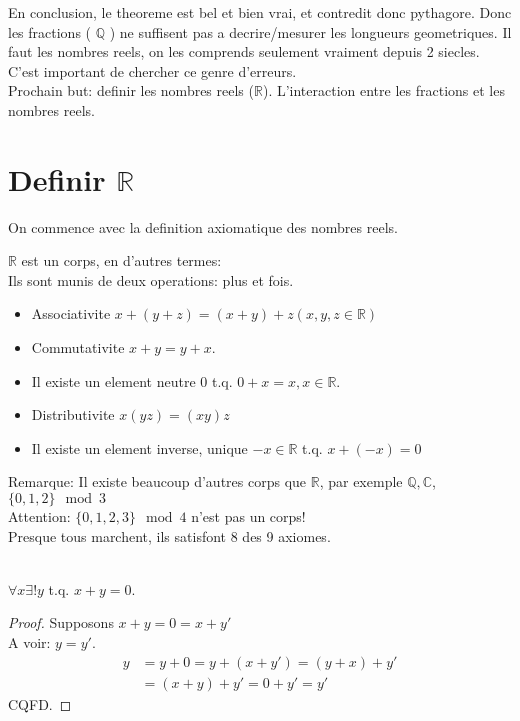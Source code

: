 \documentclass[../main.tex]{subfiles}
\begin{document}
En conclusion, le theoreme est bel et bien vrai, et contredit donc pythagore.
Donc les fractions ( $\mathbb{Q}$ ) ne suffisent pas a decrire/mesurer les longueurs geometriques.
Il faut les nombres reels, on les comprends seulement vraiment depuis 2 siecles.\\
C'est important de chercher ce genre d'erreurs.\\
Prochain but: definir les nombres reels ($\mathbb{R}$).
L'interaction entre les fractions et les nombres reels.

\section{Definir $\mathbb{R}$}
On commence avec la definition axiomatique des nombres reels.

\begin{axiom}\label{axiom:nombres_reels}
	$\mathbb{R}$ est un corps, en d'autres termes:\\
	Ils sont munis de deux operations: plus et fois.
	\begin{itemize}
		\item Associativite $x + ( y + z)= ( x+ y)+z ( x,y,z \in \mathbb{R})$ \\
		\item Commutativite $x+y = y+x$.\\
		\item Il existe un element neutre $0$ t.q. $0+x=x, x \in \mathbb{R}$.
		\item Distributivite $x ( yz)= ( xy)z$\\
		\item Il existe un element inverse, unique $-x \in \mathbb{R}$ t.q. $x + (-x)=0$
	\end{itemize}
\end{axiom}

Remarque: Il existe beaucoup d'autres corps que $\mathbb{R}$, par exemple $\mathbb{Q},\mathbb{C}$, $\{0,1,2\} \mod 3$\\

Attention: $ \{0,1,2,3\} \mod 4$ n'est pas un corps!\\
Presque tous marchent, ils satisfont 8 des 9 axiomes.\\
\hr\\
\begin{lemma}\label{lemma:theorem_name}
$\forall x \exists ! y$ t.q. $x+y = 0.$	
\end{lemma}
\begin{proof}
Supposons $x+y =0 = x+y'$ \\
A voir: $y=y'$.\\
 
\begin{align*}
	y &= y + 0 = y + (x + y') = ( y+x) + y'\\
	  &= ( x+y) + y' = 0 + y' = y'
\end{align*}
CQFD.
\end{proof}
\end{document}
